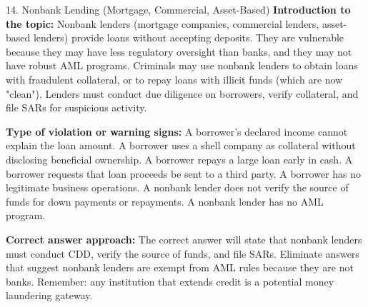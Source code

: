 \documentclass[11pt,a4paper]{beamer}
\begin{document}
\begin{frame}{14. Nonbank Lending (Mortgage, Commercial, Asset-Based)}
\tiny
\noindent\textbf{Introduction to the topic:} Nonbank lenders (mortgage companies, commercial lenders, asset-based lenders) provide loans without accepting deposits. They are vulnerable because they may have less regulatory oversight than banks, and they may not have robust AML programs. Criminals may use nonbank lenders to obtain loans with fraudulent collateral, or to repay loans with illicit funds (which are now "clean"). Lenders must conduct due diligence on borrowers, verify collateral, and file SARs for suspicious activity.

\vspace{0.1cm}
\noindent\textbf{Type of violation or warning signs:} A borrower's declared income cannot explain the loan amount. A borrower uses a shell company as collateral without disclosing beneficial ownership. A borrower repays a large loan early in cash. A borrower requests that loan proceeds be sent to a third party. A borrower has no legitimate business operations. A nonbank lender does not verify the source of funds for down payments or repayments. A nonbank lender has no AML program.

\vspace{0.1cm}
\noindent\textbf{Correct answer approach:} The correct answer will state that nonbank lenders must conduct CDD, verify the source of funds, and file SARs. Eliminate answers that suggest nonbank lenders are exempt from AML rules because they are not banks. Remember: any institution that extends credit is a potential money laundering gateway.
\end{frame}
\end{document}
